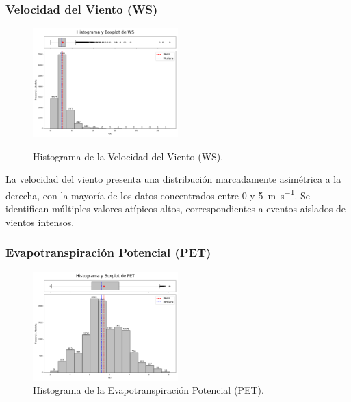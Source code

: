 \vspace{2em}

\subsubsection*{Velocidad del Viento (WS)}

\begin{figure}[H]
    \caption{Histograma de la Velocidad del Viento (WS).}
    \centering
    \includegraphics[width=0.5\textwidth]{resultados/global/univariado/WS_histograma.png}
    \label{fig:WS_histograma}
\end{figure}

La velocidad del viento presenta una distribución marcadamente asimétrica a la derecha, con la mayoría de los datos concentrados entre 0 y \SI{5}{\meter\per\second}. Se identifican múltiples valores atípicos altos, correspondientes a eventos aislados de vientos intensos.

\newpage



\subsubsection{Evapotranspiración Potencial (PET)}

\begin{figure}[H]
    \centering
    \includegraphics[width=0.5\textwidth]{resultados/global/univariado/PET_histograma.png}
    \caption{Histograma de la Evapotranspiración Potencial (PET).}
    \label{fig:PET_histograma}
\end{figure}

